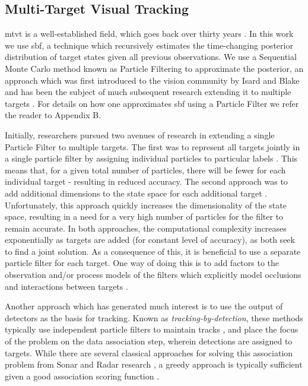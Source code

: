 \subsection{Multi-Target Visual Tracking}
\gls{mtvt} is a well-established field, which goes back over thirty years \cite{MTT_JPDA}. In this work we use \gls{sbf}, a technique which recursively estimates the time-changing posterior distribution of target states given all previous observations. We use a Sequential Monte Carlo method known as Particle Filtering to approximate the posterior, an approach which was first introduced to the vision community by Isard and Blake \cite{Condensation98} and has been the subject of much subsequent research extending it to multiple targets \cite{TrackingMultipleParticleFiltering,MonteCarloMTT,SequentialMonteCarloMultitargetFiltering}. For details on how one approximates \gls{sbf} using a Particle Filter we refer the reader to Appendix B.

Initially, researchers pursued two avenues of research in extending a single Particle Filter to multiple targets. The first was to represent all targets jointly in a single particle filter by assigning individual particles to particular labels \cite{MultiMixtureTracking03}. This means that, for a given total number of particles, there will be fewer for each individual target - resulting in reduced accuracy. The second approach was to add additional dimensions to the state space for each additional target \cite{TrackMultTargets01}. Unfortunately, this approach quickly increases the dimensionality of the state space, resulting in a need for a very high number of particles for the filter to remain accurate. In both approaches, the computational complexity increases exponentially as targets are added (for constant level of accuracy), as both seek to find a joint solution. As a consequence of this, it is beneficial to use a separate particle filter for each target. One way of doing this is to add factors to the observation and/or process models of the filters which explicitly model occlusions and interactions between targets \cite{MCMCParteFilt_05, ApproxMultiTrack_06}. 

Another approach which has generated much interest is to use the output of detectors as the basis for tracking. Known as \emph{tracking-by-detection}, these methods typically use independent particle filters to maintain tracks \cite{RobustVTMT_06,MultipersonTBD_011}, and place the focus of the problem on the data association step, wherein detections are assigned to targets. While there are several classical approaches for solving this association problem from Sonar and Radar research \cite{SonarMultiTrack_83,MultiTrack_79}, a greedy approach is typically sufficient given a good association scoring function \cite{DetTrackMultiHumans_07,MultipersonTBD_011}. 


